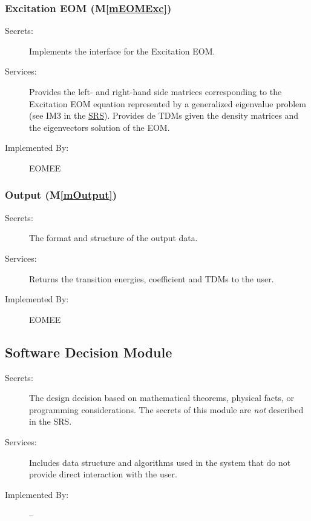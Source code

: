 \documentclass[12pt, titlepage]{article}
\newcommand{\mref}[1]{M\ref{#1}}
\begin{document}
\subsubsection{Excitation EOM (\mref{mEOMExc})}

\begin{description}
	\item[Secrets:] Implements the interface for the Excitation EOM.
	\item[Services:] Provides the left- and right-hand side matrices 
	corresponding to the Excitation EOM equation represented by a generalized 
	eigenvalue problem (see IM3 in the 
	\href{https://github.com/gabrielasd/eomee/tree/cas741/docs/SRS/}{SRS}). 
	Provides de TDMs given the density matrices and the 
	eigenvectors solution of the EOM.
	\item[Implemented By:] EOMEE
\end{description}

\subsubsection{Output (\mref{mOutput})}

\begin{description}
	\item[Secrets:]The format and structure of the output data.
	\item[Services:] Returns the transition energies, coefficient and TDMs to 
	the user.
	\item[Implemented By:] EOMEE
\end{description}


\subsection{Software Decision Module}

\begin{description}
\item[Secrets:] The design decision based on mathematical theorems, physical
  facts, or programming considerations. The secrets of this module are
  \emph{not} described in the SRS.
\item[Services:] Includes data structure and algorithms used in the system that
  do not provide direct interaction with the user. 
\item[Implemented By:] --
\end{description}
\end{document}
